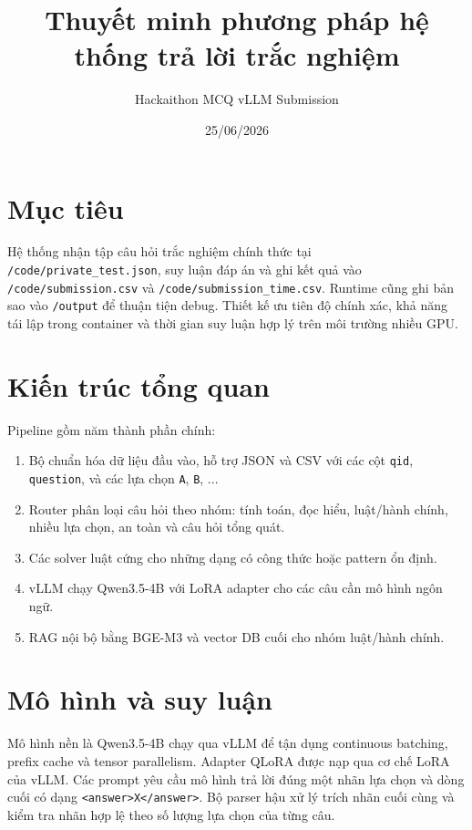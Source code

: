 \documentclass[12pt,a4paper]{article}
\title{Thuyết minh phương pháp hệ thống trả lời trắc nghiệm}
\author{Hackaithon MCQ vLLM Submission}
\date{25/06/2026}
\begin{document}
\maketitle

\section{Mục tiêu}

Hệ thống nhận tập câu hỏi trắc nghiệm chính thức tại \texttt{/code/private\_test.json},
suy luận đáp án và ghi kết quả vào \texttt{/code/submission.csv} và
\texttt{/code/submission\_time.csv}. Runtime cũng ghi bản sao vào \texttt{/output}
để thuận tiện debug. Thiết kế ưu tiên
độ chính xác, khả năng tái lập trong container và thời gian suy luận hợp lý
trên môi trường nhiều GPU.

\section{Kiến trúc tổng quan}

Pipeline gồm năm thành phần chính:

\begin{enumerate}[leftmargin=*]
  \item Bộ chuẩn hóa dữ liệu đầu vào, hỗ trợ JSON và CSV với các cột
  \texttt{qid}, \texttt{question}, và các lựa chọn \texttt{A}, \texttt{B}, ...
  \item Router phân loại câu hỏi theo nhóm: tính toán, đọc hiểu, luật/hành
  chính, nhiều lựa chọn, an toàn và câu hỏi tổng quát.
  \item Các solver luật cứng cho những dạng có công thức hoặc pattern ổn định.
  \item vLLM chạy Qwen3.5-4B với LoRA adapter cho các câu cần mô hình ngôn ngữ.
  \item RAG nội bộ bằng BGE-M3 và vector DB cuối cho nhóm luật/hành chính.
\end{enumerate}

\section{Mô hình và suy luận}

Mô hình nền là Qwen3.5-4B chạy qua vLLM để tận dụng continuous batching,
prefix cache và tensor parallelism. Adapter QLoRA được nạp qua cơ chế LoRA của
vLLM. Các prompt yêu cầu mô hình trả lời đúng một nhãn lựa chọn và dòng cuối có
dạng \texttt{<answer>X</answer>}. Bộ parser hậu xử lý trích nhãn cuối cùng và
kiểm tra nhãn hợp lệ theo số lượng lựa chọn của từng câu.
\end{document}
